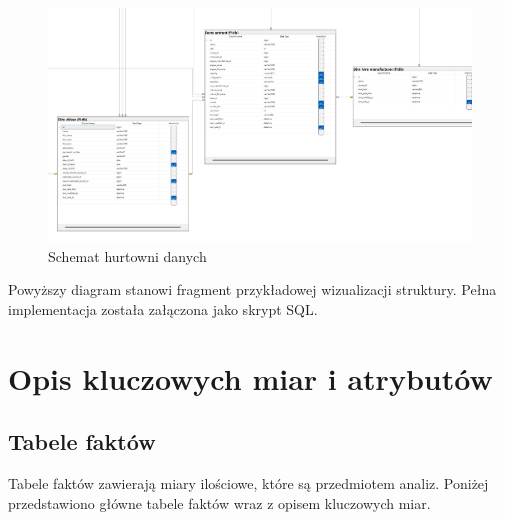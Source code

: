 \documentclass[12pt]{article}
\begin{document}
\begin{figure}[H]
    \centering
    \includegraphics[width=\textwidth]{diagram5.png}
    \caption{Schemat hurtowni danych}
\end{figure}

Powyższy diagram stanowi fragment przykładowej wizualizacji struktury. Pełna implementacja została załączona jako skrypt SQL.

\section{Opis kluczowych miar i atrybutów}

\subsection{Tabele faktów}
Tabele faktów zawierają miary ilościowe, które są przedmiotem analiz. Poniżej przedstawiono główne tabele faktów wraz z opisem kluczowych miar.
\end{document}
